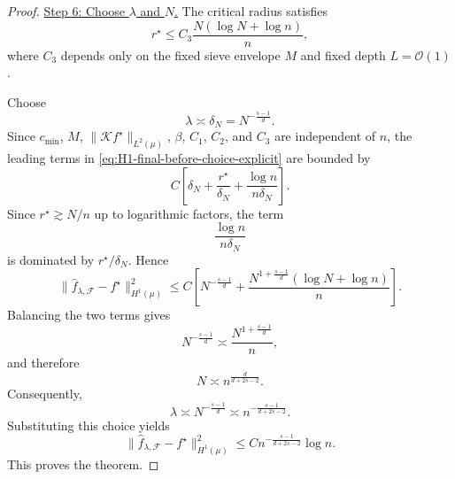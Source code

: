 \documentclass[11pt]{article}
\theoremstyle{plain}
\theoremstyle{definition}
\theoremstyle{remark}
\newcommand{\proofstep}[1]{\par\medskip\noindent\uline{#1}}
\begin{document}
\begin{proof}
\proofstep{Step 6: Choose \(\lambda\) and \(N\).}
The critical radius satisfies
\[
r^\star
\le
C_3
\frac{N(\log N+\log n)}{n},
\]
where \(C_3\) depends only on the fixed sieve envelope \(M\) and
fixed depth \(L=\mathcal{O}(1)\).

Choose
\[
\lambda\asymp\delta_N=N^{-\frac{s-1}{d}}.
\]
Since \(c_{\min}\), \(M\), \(\|\mathcal K f^\star\|_{L^2(\mu)}\), \(\beta\),
\(C_1\), \(C_2\), and \(C_3\) are independent of \(n\), the leading terms in
\eqref{eq:H1-final-before-choice-explicit} are bounded by
\[
C
\left[
\delta_N
+
\frac{r^\star}{\delta_N}
+
\frac{\log n}{n\delta_N}
\right].
\]
Since \(r^\star\gtrsim N/n\) up to logarithmic factors, the term
\[
\frac{\log n}{n\delta_N}
\]
is dominated by \(r^\star/\delta_N\). Hence
\[
\|\widehat f_{\lambda,\mathcal F}-f^\star\|_{H^1(\mu)}^2
\le
C
\left[
N^{-\frac{s-1}{d}}
+
\frac{
N^{1+\frac{s-1}{d}}(\log N+\log n)
}{n}
\right].
\]
Balancing the two terms gives
\[
N^{-\frac{s-1}{d}}
\asymp
\frac{N^{1+\frac{s-1}{d}}}{n},
\]
and therefore
\[
N\asymp n^{\frac{d}{d+2s-2}}.
\]
Consequently,
\[
\lambda
\asymp
N^{-\frac{s-1}{d}}
\asymp
n^{-\frac{s-1}{d+2s-2}}.
\]
Substituting this choice yields
\[
\|\widehat f_{\lambda,\mathcal F}-f^\star\|_{H^1(\mu)}^2
\le
C
n^{-\frac{s-1}{d+2s-2}}\log n.
\]
This proves the theorem.
\end{proof}
\end{document}

